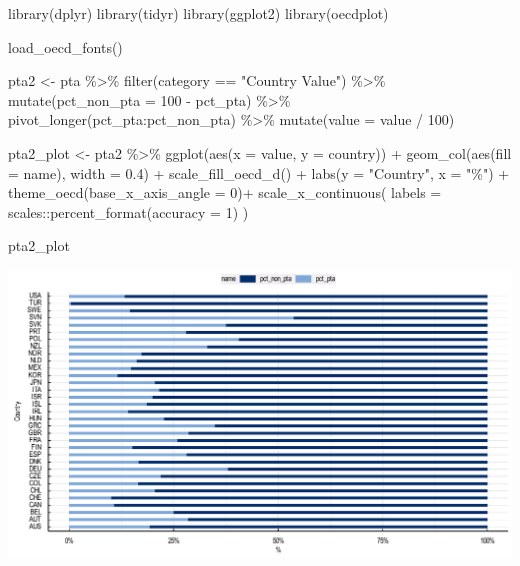 \documentclass[
  11pt,
  oneside]{report}
\newenvironment{Shaded}{\begin{snugshade}}{\end{snugshade}}
\newcommand{\AttributeTok}[1]{\textcolor[rgb]{0.77,0.63,0.00}{#1}}
\newcommand{\DecValTok}[1]{\textcolor[rgb]{0.00,0.00,0.81}{#1}}
\newcommand{\FloatTok}[1]{\textcolor[rgb]{0.00,0.00,0.81}{#1}}
\newcommand{\FunctionTok}[1]{\textcolor[rgb]{0.00,0.00,0.00}{#1}}
\newcommand{\NormalTok}[1]{#1}
\newcommand{\OtherTok}[1]{\textcolor[rgb]{0.56,0.35,0.01}{#1}}
\newcommand{\SpecialCharTok}[1]{\textcolor[rgb]{0.00,0.00,0.00}{#1}}
\newcommand{\StringTok}[1]{\textcolor[rgb]{0.31,0.60,0.02}{#1}}
\begin{document}
\begin{Shaded}
\begin{Highlighting}[]
\FunctionTok{library}\NormalTok{(dplyr)}
\FunctionTok{library}\NormalTok{(tidyr)}
\FunctionTok{library}\NormalTok{(ggplot2)}
\FunctionTok{library}\NormalTok{(oecdplot)}

\FunctionTok{load\_oecd\_fonts}\NormalTok{()}

\NormalTok{pta2 }\OtherTok{\textless{}{-}}\NormalTok{ pta }\SpecialCharTok{\%\textgreater{}\%} 
  \FunctionTok{filter}\NormalTok{(category }\SpecialCharTok{==} \StringTok{"Country Value"}\NormalTok{) }\SpecialCharTok{\%\textgreater{}\%} 
  \FunctionTok{mutate}\NormalTok{(}\AttributeTok{pct\_non\_pta =} \DecValTok{100} \SpecialCharTok{{-}}\NormalTok{ pct\_pta) }\SpecialCharTok{\%\textgreater{}\%} 
  \FunctionTok{pivot\_longer}\NormalTok{(pct\_pta}\SpecialCharTok{:}\NormalTok{pct\_non\_pta) }\SpecialCharTok{\%\textgreater{}\%} 
  \FunctionTok{mutate}\NormalTok{(}\AttributeTok{value =}\NormalTok{ value }\SpecialCharTok{/} \DecValTok{100}\NormalTok{)}

\NormalTok{pta2\_plot }\OtherTok{\textless{}{-}}\NormalTok{ pta2 }\SpecialCharTok{\%\textgreater{}\%}
  \FunctionTok{ggplot}\NormalTok{(}\FunctionTok{aes}\NormalTok{(}\AttributeTok{x =}\NormalTok{ value, }\AttributeTok{y =}\NormalTok{ country)) }\SpecialCharTok{+}
  \FunctionTok{geom\_col}\NormalTok{(}\FunctionTok{aes}\NormalTok{(}\AttributeTok{fill =}\NormalTok{ name), }\AttributeTok{width =} \FloatTok{0.4}\NormalTok{) }\SpecialCharTok{+}
  \FunctionTok{scale\_fill\_oecd\_d}\NormalTok{() }\SpecialCharTok{+}
  \FunctionTok{labs}\NormalTok{(}\AttributeTok{y =} \StringTok{"Country"}\NormalTok{, }\AttributeTok{x =} \StringTok{"\%"}\NormalTok{) }\SpecialCharTok{+}
  \FunctionTok{theme\_oecd}\NormalTok{(}\AttributeTok{base\_x\_axis\_angle =} \DecValTok{0}\NormalTok{)}\SpecialCharTok{+}
  \FunctionTok{scale\_x\_continuous}\NormalTok{(}
    \AttributeTok{labels =}\NormalTok{ scales}\SpecialCharTok{::}\FunctionTok{percent\_format}\NormalTok{(}\AttributeTok{accuracy =} \DecValTok{1}\NormalTok{)}
\NormalTok{  )}

\NormalTok{pta2\_plot}
\end{Highlighting}
\end{Shaded}

\begin{center}\includegraphics{book_figures/whatif_whitespace_1-1} \end{center}
\end{document}
